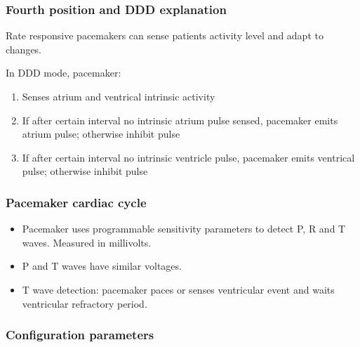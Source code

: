 \documentclass[xcolor=dvipsnames]{beamer}
\begin{document}
  \begin{frame}
    \frametitle{Fourth position and DDD explanation}
    Rate responsive pacemakers can sense patients activity level and adapt to changes.\par
    
    \hrulefill\par 
    In DDD mode, pacemaker:
    \begin{enumerate}
      \item Senses atrium and ventrical intrinsic activity
      \item If after certain interval no intrinsic atrium pulse sensed, pacemaker emits atrium pulse; otherwise inhibit pulse
      \item If after certain interval no intrinsic ventricle pulse, pacemaker emits ventrical pulse; otherwise inhibit pulse
    \end{enumerate}

  \end{frame}

  \begin{frame}
    \frametitle{Pacemaker cardiac cycle}
    \begin{itemize}
      \item Pacemaker uses programmable sensitivity parameters to detect P, R and T waves. Measured in millivolts.
      \item P and T waves have similar voltages.
      \item T wave detection: pacemaker paces or senses ventricular event and waits ventricular refractory period.
    \end{itemize}
  \end{frame}
  
  \begin{frame}
    \frametitle{Configuration parameters}

  \end{frame}
\end{document}
